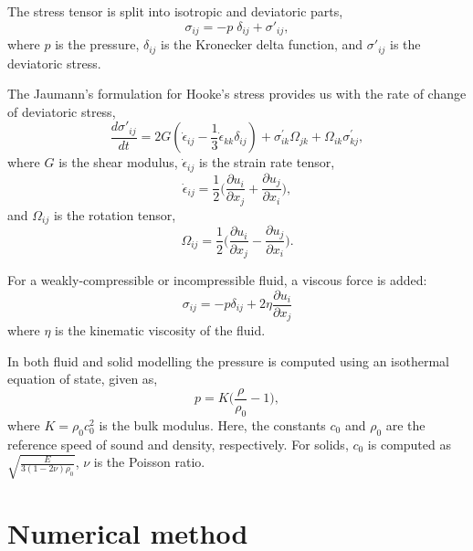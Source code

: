 \documentclass[preprint,12pt]{elsarticle}
\begin{document}
The stress tensor is split into isotropic and deviatoric parts,
\begin{equation}
  \label{eq:stress_tensor_decomposition}
  \sigma_{ij} = - p \; \delta_{ij} + \sigma'_{ij},
\end{equation}
%
where $p$ is the pressure, $\delta_{ij}$ is the Kronecker delta function, and
$\sigma'_{ij}$ is the deviatoric stress.

The Jaumann's formulation for Hooke's stress provides us with the rate of
change of deviatoric stress,
\begin{equation}
  \label{eq:jaumann-stress-rate}
  \frac{d \sigma'_{ij}}{dt} = 2G (\dot{\epsilon}_{ij} - \frac{1}{3}
  \dot{\epsilon}_{kk} \delta_{ij}) + \sigma^{'}_{ik}  \Omega_{jk} +
  \Omega_{ik} \sigma^{'}_{kj},
\end{equation}
where $G$ is the shear modulus, $\dot{\epsilon}_{ij}$ is the strain rate tensor,
\begin{equation}
  \label{eq:strain-tensor}
  \dot{\epsilon}_{ij} = \frac{1}{2} \bigg(\frac{\partial u_i}{\partial x_j} +
  \frac{\partial u_j}{\partial x_i} \bigg),
\end{equation}
and $\Omega_{ij}$ is the rotation tensor,
\begin{equation}
  \label{eq:rotational-tensor}
  \Omega_{ij} = \frac{1}{2} \bigg(\frac{\partial u_i}{\partial x_j} -
  \frac{\partial u_j}{\partial x_i} \bigg).
\end{equation}

For a weakly-compressible or incompressible fluid, a viscous force is added:
\begin{equation}
  \label{eq:fluid-stress-decomposition}
  \sigma_{ij} = - p \delta_{ij} + 2 \eta \frac{\partial u_i}{\partial x_j}
\end{equation}
where $\eta$ is the kinematic viscosity of the fluid.

In both fluid and solid modelling the pressure is computed using an
isothermal equation of state, given as,
\begin{equation}
  \label{eq:pressure-equation}
  p = K \bigg(\frac{\rho}{\rho_{0}} - 1 \bigg),
\end{equation}
where $K = \rho_{0} c_0^2$ is the bulk modulus. Here, the constants $c_0$ and
$\rho_0$ are the reference speed of sound and density, respectively. For solids,
$c_0$ is computed as $\sqrt{\frac{E}{3 (1 - 2 \nu)\rho_{0}}}$, $\nu$ is the
Poisson ratio.


\section{Numerical method}
\end{document}
